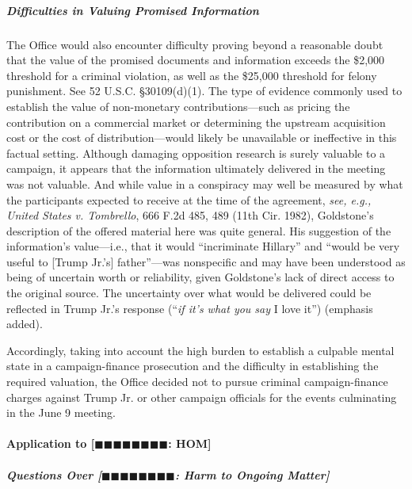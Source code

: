 \subparagraph{Difficulties in Valuing Promised Information}
The Office would also encounter difficulty proving beyond a reasonable doubt that the value of the promised documents and information exceeds the \$2,000 threshold for a criminal violation, as well as the \$25,000 threshold for felony punishment.
See 52 U.S.C. \S 30109(d)(1).
The type of evidence commonly used to establish the value of non-monetary contributions---such as pricing the contribution on a commercial market or determining the upstream acquisition cost or the cost of distribution---would likely be unavailable or ineffective in this factual setting.
Although damaging opposition research is surely valuable to a campaign, it appears that the information ultimately delivered in the meeting was not valuable.
And while value in a conspiracy may well be measured by what the participants expected to receive at the time of the agreement, \textit{see, e.g., United States v. Tombrello}, 666 F.2d 485, 489 (11th Cir. 1982), Goldstone's description of the offered material here was quite general.
His suggestion of the information's value---i.e., that it would ``incriminate Hillary'' and ``would be very useful to [Trump Jr.'s] father''---was nonspecific and may have been understood as being of uncertain worth or reliability, given Goldstone's lack of direct access to the original source.
The uncertainty over what would be delivered could be reflected in Trump Jr.'s response (``\textit{if it's what you say} I love it'') (emphasis added).

Accordingly, taking into account the high burden to establish a culpable mental state in a campaign-finance prosecution and the difficulty in establishing the required valuation, the Office decided not to pursue criminal campaign-finance charges against Trump Jr. or other campaign officials for the events culminating in the June 9 meeting.

\paragraph{Application to [$\blacksquare\blacksquare\blacksquare\blacksquare\blacksquare\blacksquare\blacksquare\blacksquare$: HOM]}

\subparagraph{Questions Over [$\blacksquare\blacksquare\blacksquare\blacksquare\blacksquare\blacksquare\blacksquare\blacksquare$: Harm to Ongoing Matter]}


